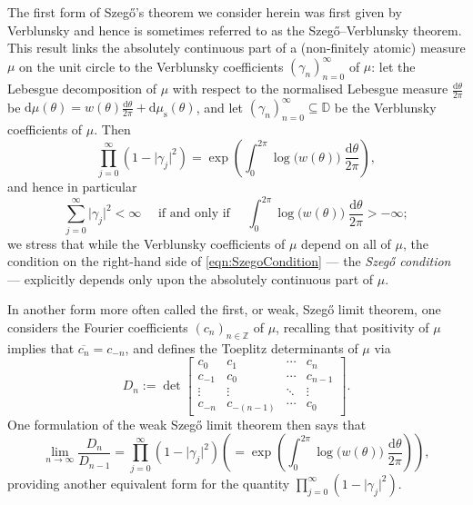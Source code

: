 \documentclass[11pt,reqno]{amsart}
\def\g{\gamma}
\def\th{\theta}
\def\rmd{\mathrm{d}}
\def\ZZ{\mathbb{Z}}
\def\DD{\mathbb{D}}
\def\rms{\mathrm{s}}
\theoremstyle{definition}
\numberwithin{equation}{section}
\begin{document}
The first form of Szeg\H{o}'s theorem we consider herein was first given by Verblunsky and hence is sometimes referred to as the Szeg\H{o}--Verblunsky theorem. This result links the absolutely continuous part of a (non-finitely atomic) measure \(\mu\) on the unit circle to the Verblunsky coefficients \((\g_n)_{n=0}^{\infty}\) of \(\mu\): let the Lebesgue decomposition of \(\mu\) with respect to the normalised Lebesgue measure \(\frac{\rmd\th}{2\pi}\) be \(\rmd \mu(\th) = w(\th) \frac{\rmd \th}{2\pi} + \rmd \mu_{\rms}(\th)\), and let \((\g_n)_{n=0}^{\infty} \subseteq \DD\) be the Verblunsky coefficients of \(\mu\). Then
\begin{equation}
    \label{eqn:SzegoVerblunsky}
    \prod_{j = 0}^{\infty} (1 - \lvert \g_j \rvert^2) = \exp \left( \int_{0}^{2\pi} \log\big(w(\th)\big) \; \frac{\rmd \th}{2\pi} \right),
\end{equation}
and hence in particular
\begin{equation}
    \label{eqn:SzegoCondition}
    \sum_{j=0}^{\infty} \lvert \g_j \rvert^2 < \infty \quad \text{ if and only if } \quad \int_{0}^{2\pi} \log\big(w(\th)\big) \; \frac{\rmd\th}{2\pi} > - \infty;
\end{equation}
we stress that while the Verblunsky coefficients of \(\mu\) depend on all of \(\mu\), the condition on the right-hand side of \eqref{eqn:SzegoCondition} --- the \emph{Szeg\H{o} condition} --- explicitly depends only upon the absolutely continuous part of \(\mu\).

In another form more often called the first, or weak, Szeg\H{o} limit theorem, one considers the Fourier coefficients \((c_n)_{n\in\ZZ}\) of \(\mu\), recalling that positivity of \(\mu\) implies that \(\overline{c_n} = c_{-n}\), and defines the Toeplitz determinants of \(\mu\) via
\begin{equation}
    \label{eqn:WeakSzegoLimit}
    D_n := \det \begin{bmatrix}c_0 & c_1 & \cdots & c_{n} \\ c_{-1} & c_0 & \cdots & c_{n-1} \\ \vdots & \vdots & \ddots & \vdots \\ c_{-n} & c_{-(n-1)} & \cdots & c_0\end{bmatrix}.
\end{equation}
One formulation of the weak Szeg\H{o} limit theorem then says that
\[
    \lim_{n\to\infty}\frac{D_n}{D_{n-1}} = \prod_{j = 0}^{\infty} (1 - \lvert \g_j \rvert^2) \left( = \exp \left( \int_{0}^{2\pi} \log\big(w(\th)\big) \; \frac{\rmd \th}{2\pi} \right) \right),
\]
providing another equivalent form for the quantity \(\prod_{j = 0}^{\infty} (1 - \lvert \g_j \rvert^2)\).
\end{document}
